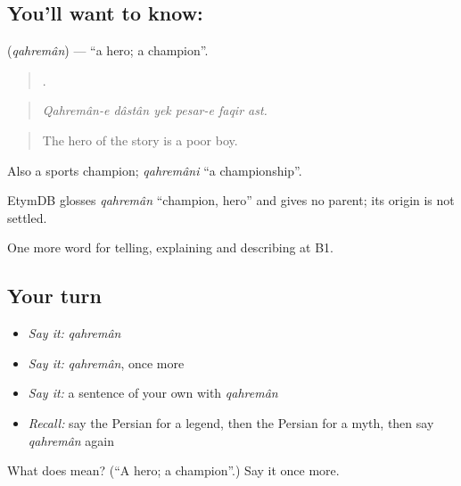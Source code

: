 \subsection*{You'll want to know: }
\textbf{} (\emph{qahremân}) — \textquotedblleft{}a hero; a champion\textquotedblright{}.

\begin{quote}
     .
\end{quote}

\begin{quote}
\emph{Qahremân-e dâstân yek pesar-e faqir ast.}
\end{quote}

\begin{quote}
The hero of the story is a poor boy.
\end{quote}

Also a sports champion; \emph{qahremâni} \textquotedblleft{}a championship\textquotedblright{}.

\begin{cousinweb}
EtymDB glosses \emph{qahremân} \textquotedblleft{}champion, hero\textquotedblright{} and gives no parent; its origin is not settled.
\end{cousinweb}

\begin{grammarlens}[title={What you've built}]
One more word for telling, explaining and describing at B1.
\end{grammarlens}

\subsection*{Your turn}
\begin{itemize}
\raggedright
  \item \emph{Say it:} \emph{qahremân}
  \item \emph{Say it:} \emph{qahremân}, once more
  \item \emph{Say it:} a sentence of your own with \emph{qahremân}
  \item \emph{Recall:} say the Persian for a legend, then the Persian for a myth, then say \emph{qahremân} again
\end{itemize}

\begin{tcolorbox}[breakable,colback=teal!4,colframe=teal!35!black,title={Before you move on}]
What does  mean? (\textquotedblleft{}A hero; a champion\textquotedblright{}.) Say it once more.
\end{tcolorbox}
